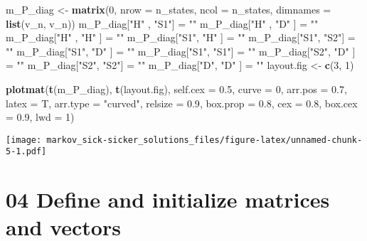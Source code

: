 \documentclass[
]{article}
\newenvironment{Shaded}{\begin{snugshade}}{\end{snugshade}}
\newcommand{\DataTypeTok}[1]{\textcolor[rgb]{0.13,0.29,0.53}{#1}}
\newcommand{\DecValTok}[1]{\textcolor[rgb]{0.00,0.00,0.81}{#1}}
\newcommand{\FloatTok}[1]{\textcolor[rgb]{0.00,0.00,0.81}{#1}}
\newcommand{\KeywordTok}[1]{\textcolor[rgb]{0.13,0.29,0.53}{\textbf{#1}}}
\newcommand{\NormalTok}[1]{#1}
\newcommand{\StringTok}[1]{\textcolor[rgb]{0.31,0.60,0.02}{#1}}
\begin{document}
\begin{Shaded}
\begin{Highlighting}[]
\NormalTok{m_P_diag <-}\StringTok{ }\KeywordTok{matrix}\NormalTok{(}\DecValTok{0}\NormalTok{, }\DataTypeTok{nrow =}\NormalTok{ n_states, }\DataTypeTok{ncol =}\NormalTok{ n_states, }\DataTypeTok{dimnames =} \KeywordTok{list}\NormalTok{(v_n, v_n))}
\NormalTok{m_P_diag[}\StringTok{"H"}\NormalTok{ , }\StringTok{"S1"}\NormalTok{] =}\StringTok{ ""} 
\NormalTok{m_P_diag[}\StringTok{"H"}\NormalTok{ , }\StringTok{"D"}\NormalTok{ ] =}\StringTok{ ""} 
\NormalTok{m_P_diag[}\StringTok{"H"}\NormalTok{ , }\StringTok{"H"}\NormalTok{ ] =}\StringTok{ ""} 
\NormalTok{m_P_diag[}\StringTok{"S1"}\NormalTok{, }\StringTok{"H"}\NormalTok{ ] =}\StringTok{ ""} 
\NormalTok{m_P_diag[}\StringTok{"S1"}\NormalTok{, }\StringTok{"S2"}\NormalTok{] =}\StringTok{ ""} 
\NormalTok{m_P_diag[}\StringTok{"S1"}\NormalTok{, }\StringTok{"D"}\NormalTok{ ] =}\StringTok{ ""} 
\NormalTok{m_P_diag[}\StringTok{"S1"}\NormalTok{, }\StringTok{"S1"}\NormalTok{] =}\StringTok{ ""} 
\NormalTok{m_P_diag[}\StringTok{"S2"}\NormalTok{, }\StringTok{"D"}\NormalTok{ ] =}\StringTok{ ""} 
\NormalTok{m_P_diag[}\StringTok{"S2"}\NormalTok{, }\StringTok{"S2"}\NormalTok{] =}\StringTok{ ""} 
\NormalTok{m_P_diag[}\StringTok{"D"}\NormalTok{, }\StringTok{"D"}\NormalTok{  ] =}\StringTok{ ""} 
\NormalTok{layout.fig <-}\StringTok{ }\KeywordTok{c}\NormalTok{(}\DecValTok{3}\NormalTok{, }\DecValTok{1}\NormalTok{)}

\KeywordTok{plotmat}\NormalTok{(}\KeywordTok{t}\NormalTok{(m_P_diag), }\KeywordTok{t}\NormalTok{(layout.fig), }\DataTypeTok{self.cex =} \FloatTok{0.5}\NormalTok{, }\DataTypeTok{curve =} \DecValTok{0}\NormalTok{, }\DataTypeTok{arr.pos =} \FloatTok{0.7}\NormalTok{,  }
        \DataTypeTok{latex =}\NormalTok{ T, }\DataTypeTok{arr.type =} \StringTok{"curved"}\NormalTok{, }\DataTypeTok{relsize =} \FloatTok{0.9}\NormalTok{, }\DataTypeTok{box.prop =} \FloatTok{0.8}\NormalTok{, }
        \DataTypeTok{cex =} \FloatTok{0.8}\NormalTok{, }\DataTypeTok{box.cex =} \FloatTok{0.9}\NormalTok{, }\DataTypeTok{lwd =} \DecValTok{1}\NormalTok{)}
\end{Highlighting}
\end{Shaded}

\texttt{[image: markov\_sick-sicker\_solutions\_files/figure-latex/unnamed-chunk-5-1.pdf]}

\hypertarget{define-and-initialize-matrices-and-vectors}{%
\section{04 Define and initialize matrices and
vectors}\label{define-and-initialize-matrices-and-vectors}}
\end{document}
